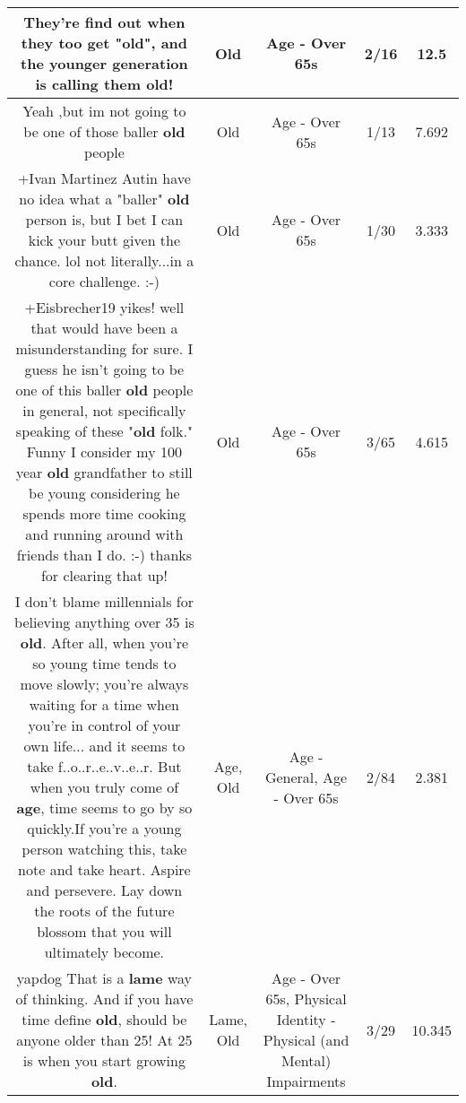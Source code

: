 \documentclass[11pt]{article}
\newlength\mylength
\begin{document}
\begin{center}
\begin{longtable}{|C{.65\mylength}|C{.30\mylength}|C{.12\mylength}|C{.12\mylength}|C{.12\mylength}|}
  \small They're find out when they too get "\textbf{old}", and the younger generation is calling them \textbf{old}!\normalsize   & Old & Age - Over 65s & 2/16 & 12.5 \\  \hline
  \small Yeah ,but im not going to be one of those baller \textbf{old} people\normalsize   & Old & Age - Over 65s & 1/13 & 7.692 \\  \hline
  \small +Ivan Martinez Autin have no idea what a "baller" \textbf{old} person is, but I bet I can kick your butt given the chance. lol not literally...in a core challenge. :-)\normalsize   & Old & Age - Over 65s & 1/30 & 3.333 \\  \hline
  \small +Eisbrecher19 yikes!  well that would have been a misunderstanding for sure. I guess he isn't going to be one of this baller \textbf{old} people in general, not specifically speaking of these "\textbf{old} folk." Funny I consider my 100 year \textbf{old} grandfather to still be young considering he spends more time cooking and running around with friends than I do. :-) thanks for clearing that up!\normalsize   & Old & Age - Over 65s & 3/65 & 4.615 \\  \hline
  \small I don't blame millennials for believing anything over 35 is \textbf{old}.  After all, when you're so young time tends to move slowly; you're always waiting for a time when you're in control of your own life... and it seems to take f..o..r..e..v..e..r.   But when you truly come of \textbf{age}, time seems to go by so quickly.If you're a young person watching this, take note and take heart.  Aspire and persevere.  Lay down the roots of the future blossom that you will ultimately become.\normalsize   & Age, Old & Age - General, Age - Over 65s & 2/84 & 2.381 \\  \hline
  \small yapdog That is a \textbf{lame} way of thinking. And if you have time define \textbf{old}, should be anyone older than 25! At 25 is when you start growing \textbf{old}.\normalsize   & Lame, Old & Age - Over 65s, Physical Identity - Physical (and Mental) Impairments & 3/29 & 10.345 \\  \hline

\end{longtable}
\end{center}
\end{document}
